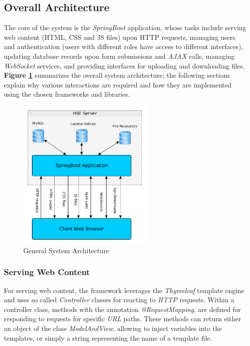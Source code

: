 \documentclass[a4paper]{usiinfbachelorproject}
\begin{document}
\subsection{\textbf{Overall Architecture}} \label{sec:archOverall}

The core of the system is the \emph{SpringBoot} application, whose tasks include serving web content
(HTML, CSS and JS files) upon HTTP requests, managing users and authentication (users with different roles have access to different interfaces),
updating database records upon form submissions and \emph{AJAX} calls, managing \emph{WebSocket} services, and
providing interfaces for uploading and downloading files. \textbf{Figure \ref{fig:archGeneral}} summarizes the
overall system architecture; the following sections explain why various interactions are required and how they are implemented using the
chosen frameworks and libraries.

\begin{figure}[h!]
\centering
\includegraphics[width=0.6\textwidth]{figures/archGeneral}
\caption{General System Architecture}
\label{fig:archGeneral}
\end{figure}

\subsubsection{\textbf{Serving Web Content}}

For serving web content, the framework leverages the \emph{Thymeleaf} \cite{thymeleafHome} template engine and uses so called \emph{Controller}
classes for reacting to \emph{HTTP} requests. Within a controller class, methods with
the annotation \emph{@RequestMapping}, are defined for responding to requests for specific \emph{URL} paths.
These methods can return either an object of the class \emph{ModelAndView}, allowing to inject
variables into the templates, or simply a string representing the name of a template file. 
\end{document}
